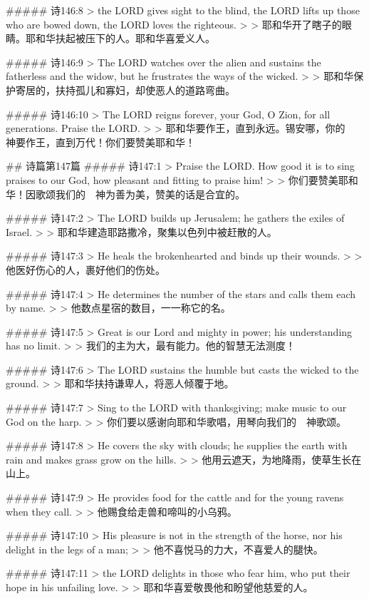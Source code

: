##### 诗146:8
> the LORD gives sight to the blind, the LORD lifts up those who are bowed down, the LORD loves the righteous.
>
> 耶和华开了瞎子的眼睛。耶和华扶起被压下的人。耶和华喜爱义人。


##### 诗146:9
> The LORD watches over the alien and sustains the fatherless and the widow, but he frustrates the ways of the wicked.
>
> 耶和华保护寄居的，扶持孤儿和寡妇，却使恶人的道路弯曲。


##### 诗146:10
> The LORD reigns forever, your God, O Zion, for all generations. Praise the LORD.
>
> 耶和华要作王，直到永远。锡安哪，你的　神要作王，直到万代！你们要赞美耶和华！


## 诗篇第147篇
##### 诗147:1
> Praise the LORD. How good it is to sing praises to our God, how pleasant and fitting to praise him!
>
> 你们要赞美耶和华！因歌颂我们的　神为善为美，赞美的话是合宜的。


##### 诗147:2
> The LORD builds up Jerusalem; he gathers the exiles of Israel.
>
> 耶和华建造耶路撒冷，聚集以色列中被赶散的人。


##### 诗147:3
> He heals the brokenhearted and binds up their wounds.
>
> 他医好伤心的人，裹好他们的伤处。


##### 诗147:4
> He determines the number of the stars and calls them each by name.
>
> 他数点星宿的数目，一一称它的名。


##### 诗147:5
> Great is our Lord and mighty in power; his understanding has no limit.
>
> 我们的主为大，最有能力。他的智慧无法测度！


##### 诗147:6
> The LORD sustains the humble but casts the wicked to the ground.
>
> 耶和华扶持谦卑人，将恶人倾覆于地。


##### 诗147:7
> Sing to the LORD with thanksgiving; make music to our God on the harp.
>
> 你们要以感谢向耶和华歌唱，用琴向我们的　神歌颂。


##### 诗147:8
> He covers the sky with clouds; he supplies the earth with rain and makes grass grow on the hills.
>
> 他用云遮天，为地降雨，使草生长在山上。


##### 诗147:9
> He provides food for the cattle and for the young ravens when they call.
>
> 他赐食给走兽和啼叫的小乌鸦。


##### 诗147:10
> His pleasure is not in the strength of the horse, nor his delight in the legs of a man;
>
> 他不喜悦马的力大，不喜爱人的腿快。


##### 诗147:11
> the LORD delights in those who fear him, who put their hope in his unfailing love.
>
> 耶和华喜爱敬畏他和盼望他慈爱的人。


